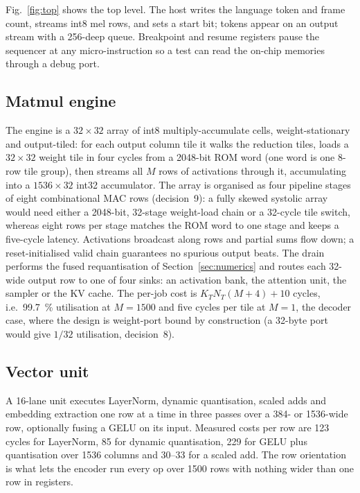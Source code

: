 \documentclass[conference]{IEEEtran}
\begin{document}
Fig.~\ref{fig:top} shows the top level. The host writes the language token and frame count, streams int8 mel rows, and sets a start bit; tokens appear on an output stream with a 256-deep queue. Breakpoint and resume registers pause the sequencer at any micro-instruction so a test can read the on-chip memories through a debug port.

\subsection{Matmul engine}
The engine is a $32\times32$ array of int8 multiply-accumulate cells, weight-stationary and output-tiled: for each output column tile it walks the reduction tiles, loads a $32\times32$ weight tile in four cycles from a 2048-bit ROM word (one word is one 8-row tile group), then streams all $M$ rows of activations through it, accumulating into a $1536\times32$ int32 accumulator. The array is organised as four pipeline stages of eight combinational MAC rows (decision~9): a fully skewed systolic array would need either a 2048-bit, 32-stage weight-load chain or a 32-cycle tile switch, whereas eight rows per stage matches the ROM word to one stage and keeps a five-cycle latency. Activations broadcast along rows and partial sums flow down; a reset-initialised valid chain guarantees no spurious output beats. The drain performs the fused requantisation of Section~\ref{sec:numerics} and routes each 32-wide output row to one of four sinks: an activation bank, the attention unit, the sampler or the KV cache. The per-job cost is $K_T N_T (M+4)+10$ cycles, i.e.\ \SI{99.7}{\percent} utilisation at $M=1500$ and five cycles per tile at $M=1$, the decoder case, where the design is weight-port bound by construction (a 32-byte port would give $1/32$ utilisation, decision~8).

\subsection{Vector unit}
A 16-lane unit executes LayerNorm, dynamic quantisation, scaled adds and embedding extraction one row at a time in three passes over a 384- or 1536-wide row, optionally fusing a GELU on its input. Measured costs per row are 123 cycles for LayerNorm, 85 for dynamic quantisation, 229 for GELU plus quantisation over 1536 columns and 30--33 for a scaled add. The row orientation is what lets the encoder run every op over 1500 rows with nothing wider than one row in registers.
\end{document}
